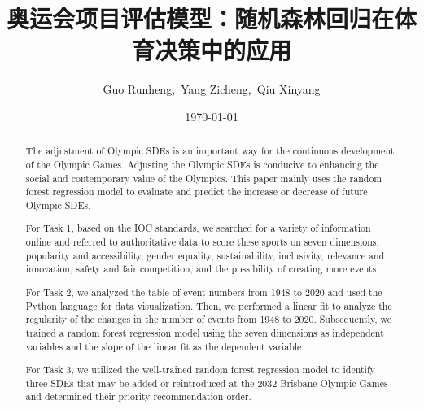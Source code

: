 \documentclass[a4paper]{article}
\title{奥运会项目评估模型：随机森林回归在体育决策中的应用}
\author{ Guo Runheng,\ Yang Zicheng,\ Qiu Xinyang}
\date{\today}
\begin{document}
    \maketitle


\begin{abstract}
    The adjustment of Olympic SDEs is an important way for the continuous development of the Olympic Games. Adjusting the Olympic SDEs is conducive to enhancing the social and contemporary value of the Olympics. This paper mainly uses the random forest regression model to evaluate and predict the increase or decrease of future Olympic SDEs.
    \par For Task 1, based on the IOC standards, we searched for a variety of information online and referred to authoritative data to score these sports on seven dimensions: popularity and accessibility, gender equality, sustainability, inclusivity, relevance and innovation, safety and fair competition, and the possibility of creating more events.
    \par For Task 2, we analyzed the table of event numbers from 1948 to 2020 and used the Python language for data visualization. Then, we performed a linear fit to analyze the regularity of the changes in the number of events from 1948 to 2020. Subsequently, we trained a random forest regression model using the seven dimensions as independent variables and the slope of the linear fit as the dependent variable.
    \par For Task 3, we utilized the well-trained random forest regression model to identify three SDEs that may be added or reintroduced at the 2032 Brisbane Olympic Games and determined their priority recommendation order.
\end{abstract}
\tableofcontents
\end{document}
